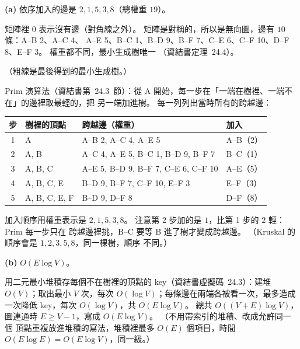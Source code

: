\begin{pastsoln}
\textbf{(a)} 依序加入的邊是 $2, 1, 5, 3, 8$（總權重 $19$）。

矩陣裡 $0$ 表示沒有邊（對角線之外）。 矩陣是對稱的，所以是無向圖，邊有 $10$ 條：A--B 2、A--C 4、
A--E 5、B--C 1、B--D 9、B--F 7、C--E 6、C--F 10、D--F 8、E--F 3。 權重都不同，最小生成樹唯一
（資結書定理~24.4）。
\begin{center}
\end{center}
（粗線是最後得到的最小生成樹。）

Prim 演算法（資結書第~24.3~節）：從 A 開始，每一步在「一端在樹裡、一端不在」的邊裡取最輕的，把
另一端加進樹。 每一列列出當時所有的跨越邊：
\begin{center}
\small
\begin{tabular}{clll}
\toprule
步 & 樹裡的頂點 & 跨越邊（權重） & 加入 \\
\midrule
1 & A & A--B 2, A--C 4, A--E 5 & A--B（2） \\
2 & A, B & A--C 4, A--E 5, B--C 1, B--D 9, B--F 7 & B--C（1） \\
3 & A, B, C & A--E 5, B--D 9, B--F 7, C--E 6, C--F 10 & A--E（5） \\
4 & A, B, C, E & B--D 9, B--F 7, C--F 10, E--F 3 & E--F（3） \\
5 & A, B, C, E, F & B--D 9, D--F 8 & D--F（8） \\
\bottomrule
\end{tabular}
\end{center}
加入順序用權重表示是 $2, 1, 5, 3, 8$。 注意第 2 步加的是 $1$，比第 1 步的 $2$ 輕：Prim 每一步只在
跨越邊裡挑，B--C 要等 B 進了樹才變成跨越邊。 （Kruskal 的順序會是 $1, 2, 3, 5, 8$，同一棵樹，順序
不同。）

\textbf{(b)} $O(E \log V)$。

用二元最小堆積存每個不在樹裡的頂點的 key（資結書虛擬碼~24.3）：建堆 $O(V)$；取出最小 $V$ 次，每次
$O(\log V)$；每條邊在兩端各被看一次，最多造成一次降低 key，每次 $O(\log V)$，共 $O(E \log V)$。 總共
$O((V + E)\log V)$，圖連通時 $E \ge V - 1$，寫成 $O(E \log V)$。 （不用帶索引的堆積、改成允許同一個
頂點重複放進堆積的寫法，堆積裡最多 $O(E)$ 個項目，時間 $O(E \log E) = O(E \log V)$，同一級。）
\end{pastsoln}
